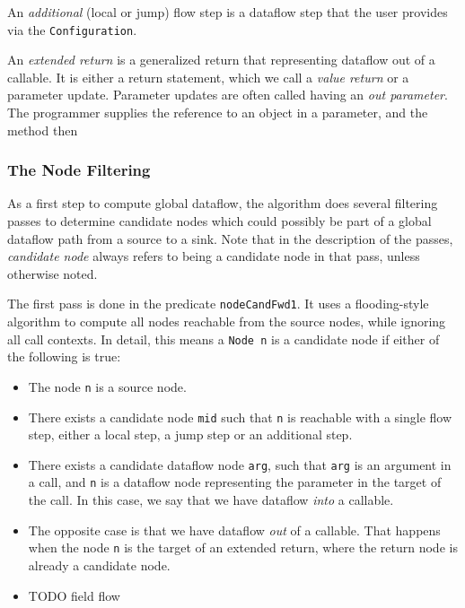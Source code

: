 An \emph{additional} (local or jump) flow step is a dataflow step that the user 
provides via the \texttt{Configuration}.

An \emph{extended return} is a generalized return that representing dataflow out of a callable.
It is either a return statement, which we call a \emph{value return} or a parameter update.
Parameter updates are often called having an \emph{out parameter}.
The programmer supplies the reference to an object in a parameter, and the method then


\subsubsection*{The Node Filtering}
As a first step to compute global dataflow, the algorithm does several filtering passes to 
determine candidate nodes which could possibly be part of a global dataflow path from
a source to a sink.
Note that in the description of the passes, \emph{candidate node} always refers
to being a candidate node in that pass, unless otherwise noted.

The first pass is done in the predicate \texttt{nodeCandFwd1}.
It uses a flooding-style algorithm to compute all nodes reachable from the source nodes,
while ignoring all call contexts.
In detail, this means a \texttt{Node n} is a candidate node if either of the following is true:
\begin{itemize}
    \item The node \texttt{n} is a source node.
    \item There exists a candidate node \texttt{mid} such that \texttt{n} is reachable with a single flow step,
    either a local step, a jump step or an additional step.
    \item There exists a candidate dataflow node \texttt{arg}, such that \texttt{arg} is an argument in 
    a call, and \texttt{n} is a dataflow node representing the parameter in the target of the call.
    In this case, we say that we have dataflow \emph{into} a callable.
    \item The opposite case is that we have dataflow \emph{out} of a callable.
    That happens when the node \texttt{n} is the target of an extended return, 
    where the return node is already a candidate node.
    \item TODO field flow
\end{itemize}

